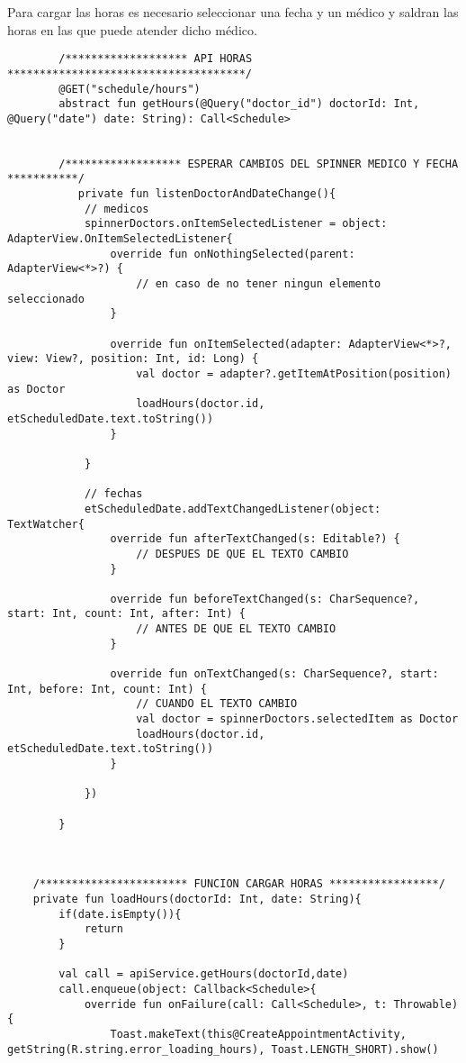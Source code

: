 \documentclass[a4paper]{article}
\begin{document}
	
	Para cargar las horas es necesario seleccionar una fecha y un médico y saldran las horas en las que puede atender dicho médico.
	
	\lstset{style=mystyle,caption=Desplegar horas,label=DescriptiveLabel}
	\begin{lstlisting}
		/******************* API HORAS *************************************/
		@GET("schedule/hours")
		abstract fun getHours(@Query("doctor_id") doctorId: Int, @Query("date") date: String): Call<Schedule>

		
		/****************** ESPERAR CAMBIOS DEL SPINNER MEDICO Y FECHA ***********/
		   private fun listenDoctorAndDateChange(){
			// medicos
			spinnerDoctors.onItemSelectedListener = object: AdapterView.OnItemSelectedListener{
				override fun onNothingSelected(parent: AdapterView<*>?) {
					// en caso de no tener ningun elemento seleccionado
				}
				
				override fun onItemSelected(adapter: AdapterView<*>?, view: View?, position: Int, id: Long) {
					val doctor = adapter?.getItemAtPosition(position) as Doctor
					loadHours(doctor.id, etScheduledDate.text.toString())
				}
				
			}
			
			// fechas
			etScheduledDate.addTextChangedListener(object: TextWatcher{
				override fun afterTextChanged(s: Editable?) {
					// DESPUES DE QUE EL TEXTO CAMBIO
				}
				
				override fun beforeTextChanged(s: CharSequence?, start: Int, count: Int, after: Int) {
					// ANTES DE QUE EL TEXTO CAMBIO
				}
				
				override fun onTextChanged(s: CharSequence?, start: Int, before: Int, count: Int) {
					// CUANDO EL TEXTO CAMBIO
					val doctor = spinnerDoctors.selectedItem as Doctor
					loadHours(doctor.id, etScheduledDate.text.toString())
				}
				
			})
			
		}
	
	
	
	/*********************** FUNCION CARGAR HORAS *****************/
	private fun loadHours(doctorId: Int, date: String){
		if(date.isEmpty()){
			return
		}
		
		val call = apiService.getHours(doctorId,date)
		call.enqueue(object: Callback<Schedule>{
			override fun onFailure(call: Call<Schedule>, t: Throwable) {
				Toast.makeText(this@CreateAppointmentActivity, getString(R.string.error_loading_hours), Toast.LENGTH_SHORT).show()
				

\end{lstlisting}
\end{document}
